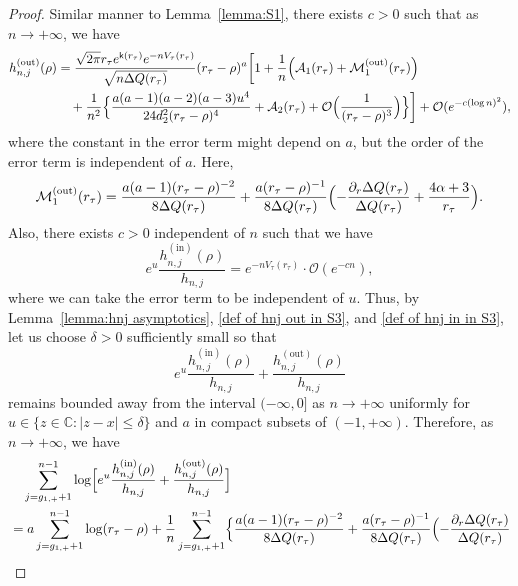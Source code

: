 \documentclass[reqno]{amsart}
\newcommand{\1}{\mathds{1}}
\newcommand{\C}{\mathds{C}}
\numberwithin{equation}{section}
\theoremstyle{definition}
\begin{document}
\begin{proof}
Similar manner to Lemma~\ref{lemma:S1}, there exists $c>0$ such that as $n\to+\infty$, we have  
\begin{align}
\begin{split}
\label{def of hnj out in S3}
h_{n,j}^{(\mathrm{out})}(\rho)
&=  
\frac{\sqrt{2\pi}r_{\tau}e^{\mathsf{k}(r_{\tau})}e^{-nV_{\tau}(r_{\tau})}}{\sqrt{n\Delta Q(r_{\tau})}}
(r_{\tau}-\rho)^a
\bigg[
1+\frac{1}{n}
\Bigl(
\mathcal{A}_1(r_{\tau})
+\mathcal{M}_1^{(\mathrm{out})}(r_{\tau})
\Bigr)
\\
&\quad
+\frac{1}{n^2}
\Bigl\{
\frac{a(a-1)(a-2)(a-3)u^4}{24d_2^2(r_{\tau}-\rho)^4}
+\mathcal{A}_2(r_{\tau})
+\mathcal{O}\Bigl(\frac{1}{(r_{\tau}-\rho)^3}\Bigr)
\Bigr\}
\bigg]
+
\mathcal{O}(e^{-c(\log n)^2}),
\end{split}
\end{align}
where the constant in the error term might depend on $a$, but the order of the error term is independent of $a$. Here, 
\[
\mathcal{M}_1^{(\mathrm{out})}(r_{\tau})
=
\frac{a(a-1)(r_{\tau}-\rho)^{-2}}{8\Delta Q(r_{\tau})}
+\frac{a(r_{\tau}-\rho)^{-1}}{8\Delta Q(r_{\tau})}
\Bigl(-\frac{\partial_r\Delta Q(r_{\tau})}{\Delta Q(r_{\tau})}
+\frac{4\alpha+3}{r_{\tau}}
\Bigr). 
\]
Also, there exists $c>0$ independent of $n$ such that we have 
\begin{equation}
\label{def of hnj in in S3}    
e^{u}\frac{h_{n,j}^{(\mathrm{in})}(\rho)}{h_{n,j}}=e^{-nV_{\tau}(r_{\tau})}\cdot\mathcal{O}(e^{-cn}), 
\end{equation}
where we can take the error term to be independent of $u$.
Thus, by Lemma~\ref{lemma:hnj asymptotics}, \eqref{def of hnj out in S3}, and \eqref{def of hnj in in S3}, let us choose $\delta>0$ sufficiently small so that 
\[
e^{u}\frac{h_{n,j}^{(\mathrm{in})}(\rho)}{h_{n,j}}+\frac{h_{n,j}^{(\mathrm{out})}(\rho)}{h_{n,j}}
\]
remains bounded away from the interval $(-\infty,0]$ as $n\to+\infty$ uniformly for $u\in\{z\in\C:|z-x|\leq \delta\}$ and $a$ in compact subsets of $(-1,+\infty)$. 
Therefore, as $n\to+\infty$, we have 
\begin{align*}
&\quad\sum_{j=g_{1,+}+1}^{n-1}\log\Bigl[
e^{u}\frac{h_{n,j}^{(\mathrm{in})}(\rho)}{h_{n,j}}+\frac{h_{n,j}^{(\mathrm{out})}(\rho)}{h_{n,j}}
 \Bigr]   
 \\
&= 
a\sum_{j=g_{1,+}+1}^{n-1}\log(r_{\tau}-\rho)
+
\frac{1}{n}
\sum_{j=g_{1,+}+1}^{n-1}
\Bigl\{ 
\frac{a(a-1)(r_{\tau}-\rho)^{-2}}{8\Delta Q(r_{\tau})}
+\frac{a(r_{\tau}-\rho)^{-1}}{8\Delta Q(r_{\tau})}
\Bigl(-\frac{\partial_r\Delta Q(r_{\tau})}{\Delta Q(r_{\tau})}

\end{align*}
\end{proof}
\end{document}

